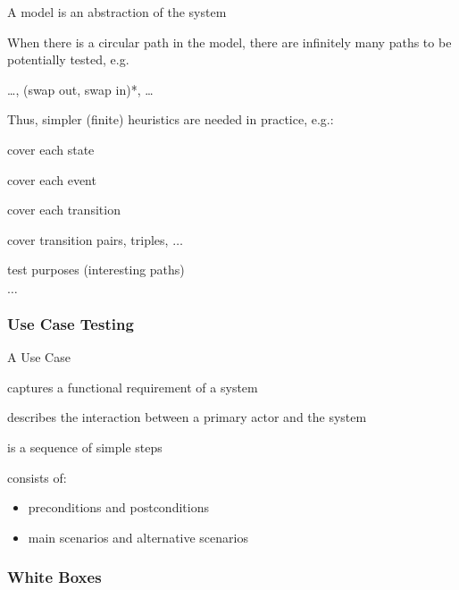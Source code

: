 \begin{itemize*}
	\item A model is an abstraction of the system
	\item When there is a circular path in the model, there are infinitely many paths to be potentially tested, e.g.\
	\begin{itemize*}
		\item \ldots, (swap out, swap in)*, \ldots
	\end{itemize*}
	\item Thus, simpler (finite) heuristics are needed in practice,	e.g.:
	\begin{itemize*}
		\item cover each state
		\item cover each event
		\item cover each transition
		\item cover transition pairs, triples, $\dots$
		\item test purposes (interesting paths)
		\item $\dots$
	\end{itemize*}	
\end{itemize*}


\subsubsection{Use Case Testing}

\begin{itemize*}
	\item A Use Case
	\begin{itemize*}
		\item captures a functional requirement of a system
		\item describes the interaction between a primary actor and
		the system
		\item is a sequence of simple steps
		\item consists of:
		\begin{itemize}
			\item preconditions and postconditions
			\item main scenarios and alternative scenarios
		\end{itemize}		
	\end{itemize*}
\end{itemize*}

\subsubsection{White Boxes}

